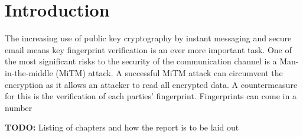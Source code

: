 \chapter{Introduction}
\label{cha:Introduction}

The increasing use of public key cryptography by instant messaging and secure email means key fingerprint  verification is an ever more important task. One of the most significant risks to the security of the communication channel is a Man-in-the-middle (MiTM) attack. A successful MiTM attack can circumvent the encryption as it allows an attacker to read all encrypted data. A countermeasure for this is the verification of each parties' fingerprint. Fingerprints can come in a number


\textbf{TODO: } Listing of chapters and how the report is to be laid out